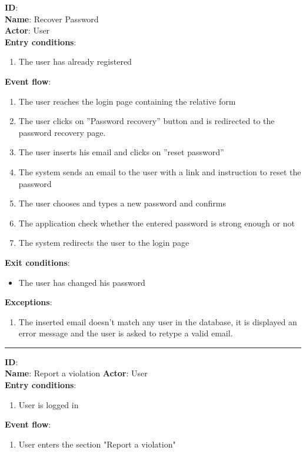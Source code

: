 \begin{enumerate}
\begin{itemize}
		\textbf{ID}:   \\
		\textbf{Name}: Recover Password \\
		\textbf{Actor}: User \\
		\textbf{Entry conditions}:
		\begin{enumerate}
			\item{The user has already registered}
		\end{enumerate}
		\textbf{Event flow}:
		\begin{enumerate}
			\item{The user reaches the login page containing the relative form}
			\item{The user clicks on ”Password recovery” button and is redirected to the password recovery page.}
			\item{The user inserts his email and clicks on ”reset password”}
			\item{The system sends an email to the user with a link and instruction to reset the password}
			\item{The user chooses and types a new password and conﬁrms}
			\item{The application check whether the entered password is strong enough or not}
			\item{The system redirects the user to the login page}
		\end{enumerate}
		\textbf{Exit conditions}:
		\begin{itemize}
			\item{The user has changed his password}
		\end{itemize}
		\textbf{Exceptions}:
		\begin{enumerate}
      		\item{The inserted email doesn't match any user in the database, it is displayed an error message and the user is asked to retype a valid email.}
 		   \end{enumerate}
		\rule{\linewidth}{0.4pt}
    \textbf{ID}:  \\
    \textbf{Name}: Report a violation
    \textbf{Actor}: User   \\
    \textbf{Entry conditions}:
    \begin{enumerate}
      \item{User is logged in}
    \end{enumerate}
    \textbf{Event flow}:
    \begin{enumerate}
      \item{User enters the section "Report a violation"}

\end{enumerate}
\end{itemize}
\end{enumerate}
